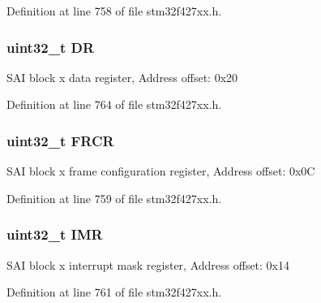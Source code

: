 Definition at line 758 of file stm32f427xx.\+h.

\subsubsection[{\texorpdfstring{DR}{DR}}]{ uint32\+\_\+t DR}\hypertarget{struct_s_a_i___block___type_def_a3df0d8dfcd1ec958659ffe21eb64fa94}{}\label{struct_s_a_i___block___type_def_a3df0d8dfcd1ec958659ffe21eb64fa94}
S\+AI block x data register, Address offset\+: 0x20 

Definition at line 764 of file stm32f427xx.\+h.

\subsubsection[{\texorpdfstring{F\+R\+CR}{FRCR}}]{ uint32\+\_\+t F\+R\+CR}\hypertarget{struct_s_a_i___block___type_def_ae307d5a553582e6c9717f50037245710}{}\label{struct_s_a_i___block___type_def_ae307d5a553582e6c9717f50037245710}
S\+AI block x frame configuration register, Address offset\+: 0x0C 

Definition at line 759 of file stm32f427xx.\+h.

\subsubsection[{\texorpdfstring{I\+MR}{IMR}}]{ uint32\+\_\+t I\+MR}\hypertarget{struct_s_a_i___block___type_def_ae845b86e973b4bf8a33c447c261633f6}{}\label{struct_s_a_i___block___type_def_ae845b86e973b4bf8a33c447c261633f6}
S\+AI block x interrupt mask register, Address offset\+: 0x14 

Definition at line 761 of file stm32f427xx.\+h.

